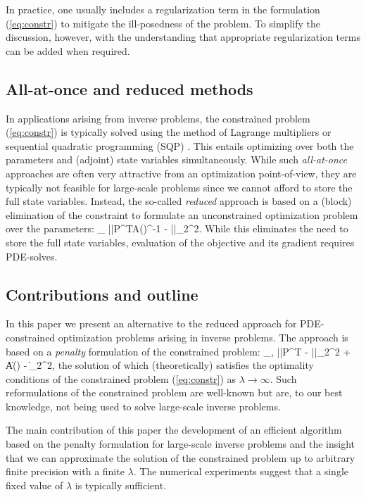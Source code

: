 \documentclass{iopart}
\begin{document}
{In practice, one usually includes a regularization term in the formulation (\ref{eq:constr}) to mitigate the ill-posedness of the problem. To simplify the discussion, however, with the understanding that appropriate regularization terms can be added when required.

\subsection{All-at-once and reduced methods}
In applications arising from inverse problems, the constrained problem (\ref{eq:constr}) is typically solved using the method of Lagrange multipliers \cite{Haber2000} or sequential quadratic programming (SQP) \cite{ennis1998,Heinkenschloss2008}. This entails optimizing over both the parameters and (adjoint) state variables simultaneously. While such \emph{all-at-once} approaches are often very attractive from an optimization point-of-view, they are typically not feasible for large-scale problems since we cannot afford to store the full state variables. Instead, the so-called \emph{reduced} approach is based on a (block) elimination of the constraint to formulate an unconstrained optimization problem over the parameters:
\bq
\label{eq:red}
\min_{} ||P^TA()^{-1} - ||_2^2.
\eq
While this eliminates the need to store the full state variables, evaluation of the objective and its gradient requires PDE-solves.

\subsection{Contributions and outline}
In this paper we present an alternative to the reduced approach for PDE-constrained optimization problems arising in inverse problems. The approach is based on a \emph{penalty} formulation of the constrained problem:
\bq
\label{eq:constr}
\min_{,} ||P^T - ||_2^2 + \|A() - \|_2^2,
\eq
the solution of which (theoretically) satisfies the optimality conditions of the constrained problem (\ref{eq:constr}) as $\lambda\rightarrow\infty$.
Such reformulations of the constrained problem are well-known but are, to our best knowledge, not being used to solve large-scale inverse problems. 

The main contribution of this paper the development of an efficient algorithm based on the penalty formulation for large-scale inverse problems and the insight that we can approximate the solution of the constrained problem up to arbitrary finite precision with a finite $\lambda$. The numerical experiments suggest that a single fixed value of $\lambda$ is typically sufficient.

}
\end{document}
